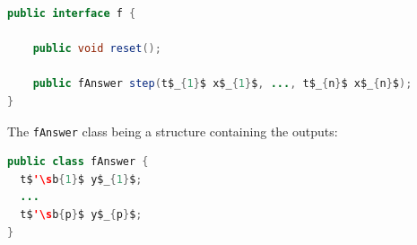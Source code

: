 \documentclass[a4paper]{article}
\begin{document}
\begin{lstlisting}[language=Java]
public interface f {
    
    public void reset();

    public fAnswer step(t$_{1}$ x$_{1}$, ..., t$_{n}$ x$_{n}$);
}
\end{lstlisting}

The \texttt{fAnswer} class being a structure containing the outputs:

\begin{lstlisting}[language=Java]
public class fAnswer {
  t$'\sb{1}$ y$_{1}$;
  ...
  t$'\sb{p}$ y$_{p}$;
}
\end{lstlisting}



\end{document}
